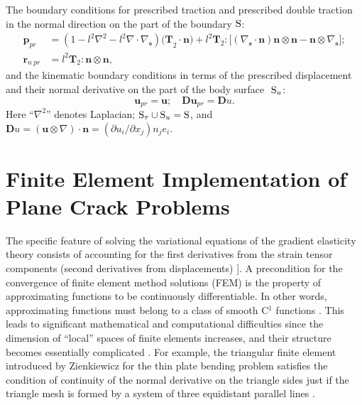 The boundary conditions for prescribed traction and prescribed double traction in the normal direction on the part of the boundary ${{\rm S}}$:
\begin{equation} \label{Chirkov_Eq_15_} 
	\begin{aligned}
		{{\mathbf p}}_{pr}&=\left(1-l^2{\nabla }^2-l^2\nabla \cdot {\nabla }_{{\mathbf s}}\right){({\mathbf T}}_2\cdot {\mathbf n}{\mathbf )}+l^2{{\mathbf T}}_2:[({\nabla }_{{\mathbf s}}\cdot {\mathbf n}){\mathbf n}\otimes {\mathbf n}-{\mathbf n}\otimes {\nabla }_{{\mathbf s}}{\mathbf ]}; 
		\\
		{{\mathbf r}}_{n\ pr}&=l^2{{\mathbf T}}_2:{\mathbf n}\otimes {\mathbf n},             
	\end{aligned}                                                                            
\end{equation} 
and the kinematic boundary conditions in terms of the prescribed displacement and their normal derivative on the part of the body surface ${\ {\rm S}}_u$:
\begin{equation} \label{Chirkov_Eq_16_} 
	{{\mathbf u}}_{pr}={\mathbf u};\quad     {\mathbf D}{{\mathbf u}}_{pr}={\mathbf Du}.                                         
\end{equation} 
Here ``${\nabla }^2$'' denotes Laplacian; ${\rm S}_{\tau} \cup {{\rm S}}_u={\rm S}$, and ${\mathbf Du}=\left({\mathbf u}\otimes \nabla \right)\cdot {\mathbf n}= (\partial u_i/\partial x_j)n_je_i$. 

\section{Finite Element Implementation of Plane Crack Problems}

The specific feature of solving the variational equations of the gradient elasticity theory consists of accounting for the first derivatives from the strain tensor components (second derivatives from displacements) \cite{Chirkov37, Chirkov47, Chirkov48, Chirkov49, Chirkov50}]. A precondition for the convergence of finite element method solutions (FEM) is the property of approximating functions to be continuously differentiable. In other words, approximating functions must belong to a class of smooth C${}^{1}$ functions \cite{Chirkov51, Chirkov52}. This leads to significant mathematical and computational difficulties since the dimension of ``local'' spaces of finite elements increases, and their structure becomes essentially complicated \cite{Chirkov52, Chirkov53}. For example, the triangular finite element introduced by Zienkiewicz for the thin plate bending problem satisfies the condition of continuity of the normal derivative on the triangle sides just if the triangle mesh is formed by a system of three equidistant parallel lines \cite{Chirkov51, Chirkov52}.

